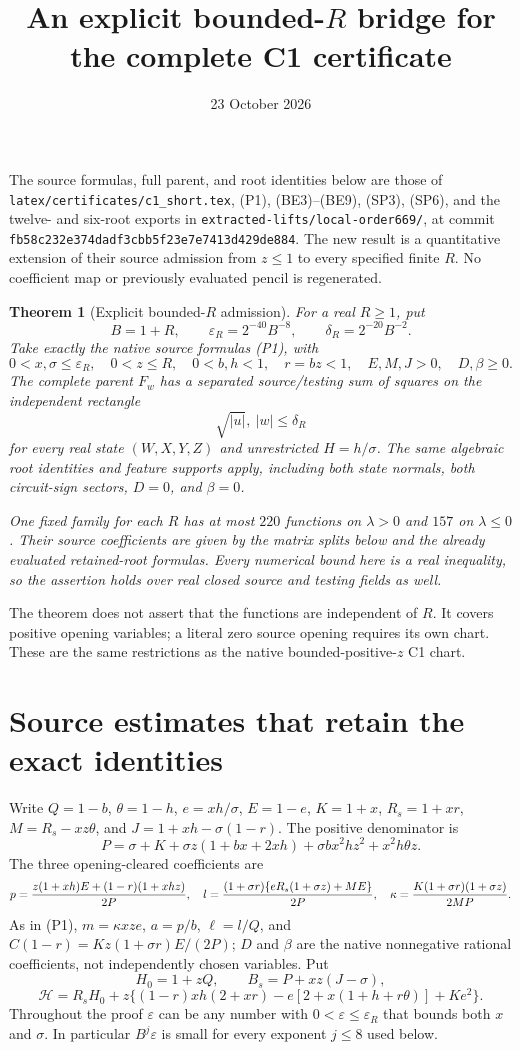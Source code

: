 \documentclass[10pt]{article}
\title{An explicit bounded-$R$ bridge for the complete C1 certificate}
\author{}\date{23 October 2026}
\newtheorem{theorem}{Theorem}
\newcommand{\eps}{\varepsilon}
\begin{document}
\maketitle

The source formulas, full parent, and root identities below are those of
\texttt{latex/certificates/c1\_short.tex}, (P1), (BE3)--(BE9), (SP3),
(SP6), and the twelve- and six-root exports in
\texttt{extracted-lifts/local-order669/}, at commit
\texttt{fb58c232e374dadf3cbb5f23e7e7413d429de884}.
The new result is a quantitative extension of their source admission
from $z\le1$ to every specified finite $R$. No coefficient map or
previously evaluated pencil is regenerated.

\begin{theorem}[Explicit bounded-$R$ admission]\label{thm:bridge}
For a real $R\ge1$, put
\[
 B=1+R,\qquad \eps_R=2^{-40}B^{-8},\qquad
 \delta_R=2^{-20}B^{-2}.
\]
Take exactly the native source formulas (P1), with
\[
 0<x,\sigma\le\eps_R,\quad 0<z\le R,\quad
 0<b,h<1,\quad r=bz<1,\quad E,M,J>0,\quad D,\beta\ge0.
\]
The complete parent $F_w$ has a separated source/testing sum of squares
on the independent rectangle
\[
             \sqrt{|u|},\ |w|\le\delta_R
\]
for every real state $(W,X,Y,Z)$ and unrestricted $H=h/\sigma$.
The same algebraic root identities and feature supports apply, including
both state normals, both circuit-sign sectors, $D=0$, and $\beta=0$.

One fixed family for each $R$ has at most $220$ functions on $\lambda>0$
and $157$ on $\lambda\le0$. Their source coefficients are given by the
matrix splits below and the already evaluated retained-root formulas.
Every numerical bound here is a real inequality, so the assertion
holds over real closed source and testing fields as well.
\end{theorem}

The theorem does not assert that the functions are independent of $R$.
It covers positive opening variables; a literal zero source opening
requires its own chart. These are the same restrictions as the native
bounded-positive-$z$ C1 chart.

\section{Source estimates that retain the exact identities}

Write $Q=1-b$, $\theta=1-h$, $e=xh/\sigma$, $E=1-e$, $K=1+x$,
$R_s=1+xr$, $M=R_s-xz\theta$, and
$J=1+xh-\sigma(1-r)$. The positive denominator is
\[
 P=\sigma+K+\sigma z(1+bx+2xh)
                  +\sigma bx^2hz^2+x^2h\theta z.
\]
The three opening-cleared coefficients are
\[
 p={z(1+xh)E+(1-r)(1+xhz)\over2P},\quad
 l={(1+\sigma r)\{eR_s(1+\sigma z)+ME\}\over2P},\quad
 \kappa={K(1+\sigma r)(1+\sigma z)\over2MP}.
\]
As in (P1), $m=\kappa xze$, $a=p/b$, $\ell=l/Q$, and
$C(1-r)=Kz(1+\sigma r)E/(2P)$; $D$ and $\beta$ are the native
nonnegative rational coefficients, not independently chosen variables.
Put
\[
 H_0=1+zQ,\qquad B_s=P+xz(J-\sigma),
\]
\[
 \mathcal H=R_sH_0+z\{(1-r)xh(2+xr)
       -e[2+x(1+h+r\theta)]+Ke^2\}.
\]
Throughout the proof $\eps$ can be any number with $0<\eps\le\eps_R$
that bounds both $x$ and $\sigma$. In particular $B^j\eps$ is small
for every exponent $j\le8$ used below.
\end{document}
